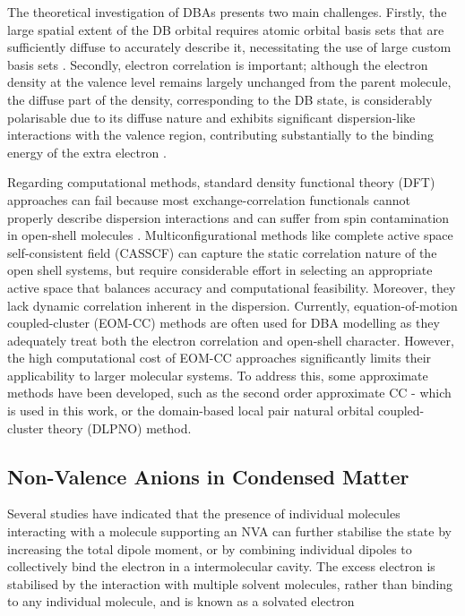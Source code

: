 The theoretical investigation of DBAs presents two main challenges. Firstly, the large spatial extent of the DB orbital requires atomic orbital basis sets that are sufficiently diffuse to accurately describe it, necessitating the use of large custom basis sets \cite{skurski2000choose}. Secondly, electron correlation is important; although the electron density at the valence level remains largely unchanged from the parent molecule, the diffuse part of the density, corresponding to the DB state, is considerably polarisable due to its diffuse nature and exhibits significant dispersion-like interactions with the valence region, contributing substantially to the binding energy of the extra electron \cite{simons2008molecular,simons2011theoretical,simons2023molecular,gutowski1996contribution,voora2017theoretical}.

Regarding computational methods, standard density functional theory (DFT) approaches can fail because most exchange-correlation functionals cannot properly describe dispersion interactions and can suffer from spin contamination in open-shell molecules \cite{thiam2023accurately}. Multiconfigurational methods like complete active space self-consistent field (CASSCF)\cite{vila2002theoretical,ivanov2015anion} can capture the static correlation nature of the open shell systems, but require considerable effort in selecting an appropriate active space that balances accuracy and computational feasibility. Moreover, they lack dynamic correlation inherent in the dispersion. Currently, equation-of-motion coupled-cluster (EOM-CC)\cite{herbert2015quantum,jordan2003theory,moorby2024signatures} methods are often used for DBA modelling as they adequately treat both the electron correlation and open-shell character. However, the high computational cost of EOM-CC approaches significantly limits their applicability to larger molecular systems. To address this, some approximate methods have been developed, such as the second order approximate CC \cite{christiansen1995second,paran2024performance}- which is used in this work, or the domain-based local pair natural orbital coupled-cluster theory (DLPNO) method\cite{haldar2020multilayer,schulz2018systematic}.

\subsection{Non-Valence Anions in Condensed Matter}

Several studies have indicated that the presence of individual molecules interacting with a molecule supporting an NVA can further stabilise the state by increasing the total dipole moment, or by combining individual dipoles to collectively bind the electron in a intermolecular cavity. The excess electron is stabilised by the interaction with multiple solvent molecules, rather than binding to any individual molecule, and is known as a solvated electron \cite{schiedt1998anion,hall2002two,jalbout2001dipole,gutowski2002solvated,skurski2002excess,jordan2003theory,eustis2007photoelectron,simons2008molecular,herbert2015quantum,clarke2025role}

